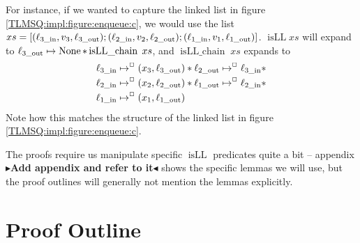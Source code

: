 \documentclass[a4paper, 11pt]{report}
\newcommand{\isLLchain}[1]{\operatorname{isLL\_chain} \; #1}
\newcommand{\isLL}{\operatorname{isLL}}
\newcommand{\locin}[1]{\loc_{#1\_\text{in}}}
\newcommand{\locout}[1]{\loc_{#1\_\text{out}}}
\newcommand{\todo}[1]{{\color[rgb]{.5,0,0}\textbf{$\blacktriangleright$#1$\blacktriangleleft$}}}
\begin{document}
For instance, if we wanted to capture the linked list in figure \ref{TLMSQ:impl:figure:enqueue:c}, we would use the list $xs = [(\locin{3}, v_3, \locout{3}); (\locin{2}, v_2, \locout{2});  (\locin{1}, v_1, \locout{1})]$. $\isLL{xs}$ will expand to $\locout{3} \mapsto \None \star \isLLchain{xs}$, and $\isLLchain{xs}$ expands to
\begin{align*}
  &\locin{3} \mapsto^{\persistently} (x_3, \locout{3}) \star \locout{2}	\mapsto^{\persistently} \locin{3}\star\\
  &\locin{2} \mapsto^{\persistently} (x_2, \locout{2}) \star \locout{1}\mapsto^{\persistently} \locin{2} \star\\
  &\locin{1} \mapsto^{\persistently} (x_1, \locout{1})
\end{align*}
Note how this matches the structure of the linked list in figure \ref{TLMSQ:impl:figure:enqueue:c}.

The proofs require us manipulate specific $\isLL$ predicates quite a bit -- appendix \todo{Add appendix and refer to it} shows the specific lemmas we will use, but the proof outlines will generally not mention the lemmas explicitly.

\section{Proof Outline}
\label{TLMSQSEQ:section:proof-outline}
\end{document}
